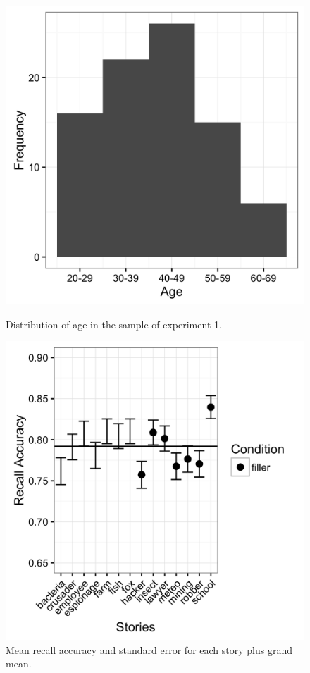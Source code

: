 \documentclass[a4paper,man,natbib,floatsintext,import]{apa6}
\begin{document}
\begin{figure}
\begin{minipage}[t]{0.5\textwidth}
  \includegraphics[width=.9\linewidth]{figures/sample_age.png}
  \caption{Distribution of age in the sample of experiment 1.}
  \label{fig:sample_age}
\end{minipage}
\begin{minipage}[t]{0.5\textwidth}
  \includegraphics[width=.9\linewidth]{figures/material_stories.png}
  \caption{Mean recall accuracy and standard error for each story plus grand mean.}
  \label{fig:material_stories}
\end{minipage}
\end{figure}
\end{document}
